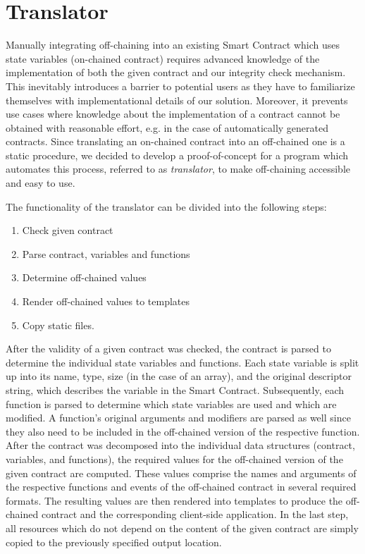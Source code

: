 \section{Translator}

Manually integrating off-chaining into an existing Smart Contract which uses state variables (on-chained contract) requires advanced knowledge of the implementation of both the given contract and our integrity check mechanism. This inevitably introduces a barrier to potential users as they have to familiarize themselves with implementational details of our solution. Moreover, it prevents use cases where knowledge about the implementation of a contract cannot be obtained with reasonable effort, e.g. in the case of automatically generated contracts. Since translating an on-chained contract into an off-chained one is a static procedure, we decided to develop a proof-of-concept for a program which automates this process, referred to as \emph{translator}, to make off-chaining accessible and easy to use.

The functionality of the translator can be divided into the following steps:
\begin{enumerate}
\setlength{\itemsep}{0pt}
\setlength{\parskip}{0pt}
	\item Check given contract
	\item Parse contract, variables and functions
	\item Determine off-chained values
	\item Render off-chained values to templates
	\item Copy static files.
\end{enumerate}
After the validity of a given contract was checked, the contract is parsed to determine the individual state variables and functions. Each state variable is split up into its name, type, size (in the case of an array), and the original descriptor string, which describes the variable in the Smart Contract. Subsequently, each function is parsed to determine which state variables are used and which are modified. A function's original arguments and modifiers are parsed as well since they also need to be included in the off-chained version of the respective function. After the contract was decomposed into the individual data structures (contract, variables, and functions), the required values for the off-chained version of the given contract are computed. These values comprise the names and arguments of the respective functions and events of the off-chained contract in several required formats. The resulting values are then rendered into templates to produce the off-chained contract and the corresponding client-side application. In the last step, all resources which do not depend on the content of the given contract are simply copied to the previously specified output location.

